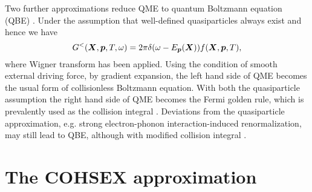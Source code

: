 \documentclass[hyperref, a4paper]{article}
\begin{document}
Two further approximations reduce QME to quantum Boltzmann equation (QBE)
\cite{rammer1986quantum,haug2008quantum}.
Under the assumption that well-defined quasiparticles always exist and hence we have 
\begin{equation}
    G^<(\vb*{X}, \vb*{p}, T, \omega) = 2\pi \delta(\omega - E_{\vb*{p}}(\vb*{X})) f(\vb*{X}, \vb*{p}, T),
\end{equation}
where Wigner transform has been applied.
Using the condition of smooth external driving force,
by gradient expansion, the left hand side of QME becomes 
the usual form of collisionless Boltzmann equation.
With both the quasiparticle assumption the right hand side of QME 
becomes the Fermi golden rule, 
which is prevalently used as the collision integral \cite{chen2022first}.
Deviations from the quasiparticle approximation,
e.g. strong electron-phonon interaction-induced renormalization, 
may still lead to QBE,
although with modified collision integral \cite{rammer1986quantum,wais2018quantum}.

\section{The COHSEX approximation} 

\printbibliography
\end{document}
